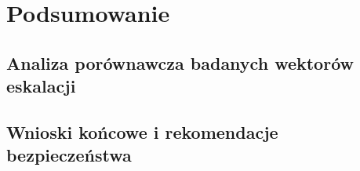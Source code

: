 \chapter{Podsumowanie}\label{ch:podsumowanie}

\section{Analiza porównawcza badanych wektorów eskalacji}\label{sec:analiza-porownawcza}

\section{Wnioski końcowe i rekomendacje bezpieczeństwa}\label{sec:wnioski-koncowe}

